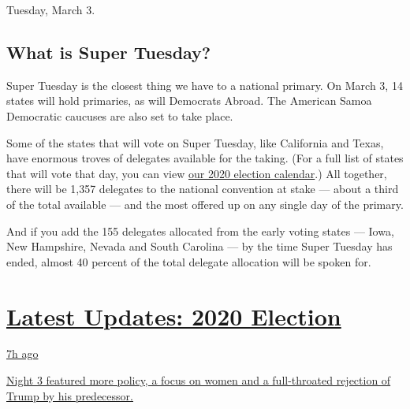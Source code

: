 Tuesday, March 3.

\hypertarget{what-is-super-tuesday}{%
\subsection{What is Super Tuesday?}\label{what-is-super-tuesday}}

Super Tuesday is the closest thing we have to a national primary. On
March 3, 14 states will hold primaries, as will Democrats Abroad. The
American Samoa Democratic caucuses are also set to take place.

Some of the states that will vote on Super Tuesday, like California and
Texas, have enormous troves of delegates available for the taking. (For
a full list of states that will vote that day, you can view
\href{https://www.nytimes3xbfgragh.onion/interactive/2019/us/elections/2020-presidential-election-calendar.html}{our
2020 election calendar}.) All together, there will be 1,357 delegates to
the national convention at stake --- about a third of the total
available --- and the most offered up on any single day of the primary.

And if you add the 155 delegates allocated from the early voting states
--- Iowa, New Hampshire, Nevada and South Carolina --- by the time Super
Tuesday has ended, almost 40 percent of the total delegate allocation
will be spoken for.

\hypertarget{latest-updates-2020-election}{%
\section{\texorpdfstring{\href{https://www.nytimes3xbfgragh.onion/live/2020/08/19/us/dnc-convention-election?action=click\&pgtype=Article\&state=default\&region=MAIN_CONTENT_1\&context=storylines_live_updates}{Latest
Updates: 2020
Election}}{Latest Updates: 2020 Election}}\label{latest-updates-2020-election}}

\href{https://www.nytimes3xbfgragh.onion/live/2020/08/19/us/dnc-convention-election?action=click\&pgtype=Article\&state=default\&region=MAIN_CONTENT_1\&context=storylines_live_updates\#night-3-featured-more-policy-a-focus-on-women-and-a-full-throated-rejection-of-trump-by-his-predecessor}{7h
ago}

\href{https://www.nytimes3xbfgragh.onion/live/2020/08/19/us/dnc-convention-election?action=click\&pgtype=Article\&state=default\&region=MAIN_CONTENT_1\&context=storylines_live_updates\#night-3-featured-more-policy-a-focus-on-women-and-a-full-throated-rejection-of-trump-by-his-predecessor}{Night
3 featured more policy, a focus on women and a full-throated rejection
of Trump by his predecessor.}

